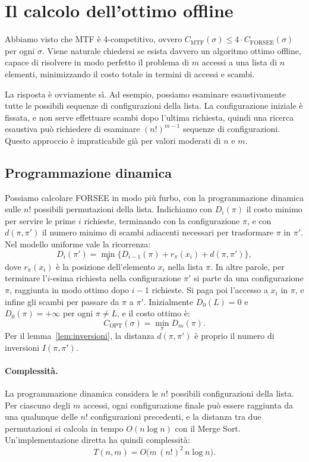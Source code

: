 \section{Il calcolo dell'ottimo offline}\label{sec:mtf-opt}
Abbiamo visto che MTF è 4-competitivo, ovvero $C_{\mathrm{MTF}}(\sigma) \le 4 \cdot C_{\mathrm{FORSEE}}(\sigma)$ per ogni $\sigma$. Viene naturale chiedersi se esista davvero un algoritmo ottimo offline, capace di risolvere in modo perfetto il problema di $m$ accessi a una lista di $n$ elementi, minimizzando il costo totale in termini di accessi e scambi.

La risposta è ovviamente sì. Ad esempio, possiamo esaminare esaustivamente tutte le possibili sequenze di configurazioni della lista. La configurazione iniziale è fissata, e non serve effettuare scambi dopo l'ultima richiesta, quindi una ricerca esaustiva può richiedere di esaminare $(n!)^{m-1}$ sequenze di configurazioni. Questo approccio è impraticabile già per valori moderati di $n$ e $m$.

\subsection{Programmazione dinamica}\label{sec:mtf-dp}
Possiamo calcolare FORSEE in modo più furbo, con la programmazione dinamica sulle $n!$ possibili permutazioni della lista. Indichiamo con $D_i(\pi)$ il costo minimo per servire le prime $i$ richieste, terminando con la configurazione $\pi$, e con $d(\pi, \pi')$ il numero minimo di scambi adiacenti necessari per trasformare $\pi$ in $\pi'$. Nel modello uniforme vale la ricorrenza:
\[
D_i(\pi') = \min_{\pi} \big\{ D_{i-1}(\pi) + r_\pi(x_i) + d(\pi, \pi') \big\},
\]
dove $r_\pi(x_i)$ è la posizione dell'elemento $x_i$ nella lista $\pi$. In altre parole, per terminare l'$i$-esima richiesta nella configurazione $\pi'$ si parte da una configurazione $\pi$, raggiunta in modo ottimo dopo $i-1$ richieste. Si paga poi l'accesso a $x_i$ in $\pi$, e infine gli scambi per passare da $\pi$ a $\pi'$. Inizialmente $D_0(L) = 0$ e $D_0(\pi) = +\infty$ per ogni $\pi \ne L$, e il costo ottimo è:
\[
C_{\mathrm{OPT}}(\sigma) = \min_{\pi} D_m(\pi).
\]
Per il lemma~\ref{lem:inversioni}, la distanza $d(\pi, \pi')$ è proprio il numero di inversioni $I(\pi, \pi')$.

\paragraph{Complessità.}
La programmazione dinamica considera le $n!$ possibili configurazioni della lista. Per ciascuno degli $m$ accessi, ogni configurazione finale può essere raggiunta da una qualunque delle $n!$ configurazioni precedenti, e la distanza tra due permutazioni si calcola in tempo $O(n \log n)$ con il Merge Sort. Un'implementazione diretta ha quindi complessità:
\[
T(n, m) = O\big(m\, (n!)^2\, n \log n\big).
\]

